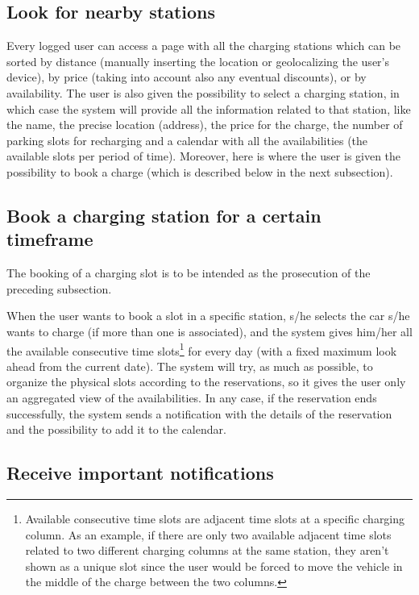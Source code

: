\subsection{Look for nearby stations}

Every logged user can access a page with all the charging stations which can be sorted by distance (manually inserting the location or geolocalizing the user's device), by price (taking into account also any eventual discounts), or by availability. The user is also given the possibility to select a charging station, in which case the system will provide all the information related to that station, like the name, the precise location (address), the price for the charge, the number of parking slots for recharging and a calendar with all the availabilities (the available slots per period of time). Moreover, here is where the user is given the possibility to book a charge (which is described below in the next subsection).

\subsection{Book a charging station for a certain timeframe}

The booking of a charging slot is to be intended as the prosecution of the preceding subsection.\medskip

When the user wants to book a slot in a specific station, s/he selects the car s/he wants to charge (if more than one is associated), and the system gives him/her all the available consecutive time slots\footnote{Available consecutive time slots are adjacent time slots at a specific charging column. As an example, if there are only two available adjacent time slots related to two different charging columns at the same station, they aren't shown as a unique slot since the user would be forced to move the vehicle in the middle of the charge between the two columns.} for every day (with a fixed maximum look ahead from the current date). The system will try, as much as possible, to organize the physical slots according to the reservations, so it gives the user only an aggregated view of the availabilities. In any case, if the reservation ends successfully, the system sends a notification with the details of the reservation and the possibility to add it to the calendar.

\subsection{Receive important notifications}

